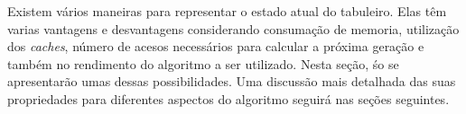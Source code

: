 Existem vários maneiras para representar o estado atual do tabuleiro. Elas têm varias vantagens e desvantagens considerando consumação de memoria, utilização dos \textit{caches}, número de acesos necessários para calcular a próxima geração e também no rendimento do algoritmo a ser utilizado. Nesta seção, śo se apresentarão umas dessas possibilidades. Uma discussão mais detalhada das suas propriedades para diferentes aspectos do algoritmo seguirá nas seções seguintes.\\



